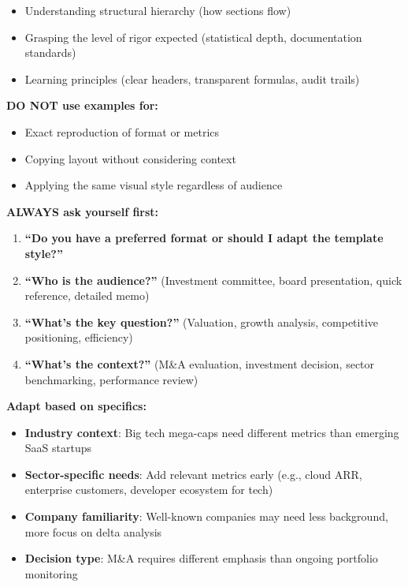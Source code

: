 \documentclass[11pt]{article}
\begin{document}
\begin{itemize}[leftmargin=*,itemsep=2pt,topsep=2pt]
\item {} Understanding structural hierarchy (how sections flow)
\item {} Grasping the level of rigor expected (statistical depth, documentation standards)
\item {} Learning principles (clear headers, transparent formulas, audit trails)
\end{itemize}

\textbf{DO NOT use examples for:}

\begin{itemize}[leftmargin=*,itemsep=2pt,topsep=2pt]
\item {} Exact reproduction of format or metrics
\item {} Copying layout without considering context
\item {} Applying the same visual style regardless of audience
\end{itemize}

\textbf{ALWAYS ask yourself first:}

\begin{enumerate}[leftmargin=*,itemsep=2pt,topsep=2pt]
\item {} \textbf{``Do you have a preferred format or should I adapt the template style?''}
\item {} \textbf{``Who is the audience?''} (Investment committee, board presentation, quick reference, detailed memo)
\item {} \textbf{``What's the key question?''} (Valuation, growth analysis, competitive positioning, efficiency)
\item {} \textbf{``What's the context?''} (M\&A evaluation, investment decision, sector benchmarking, performance review)
\end{enumerate}

\textbf{Adapt based on specifics:}

\begin{itemize}[leftmargin=*,itemsep=2pt,topsep=2pt]
\item {} \textbf{Industry context}: Big tech mega-caps need different metrics than emerging SaaS startups
\item {} \textbf{Sector-specific needs}: Add relevant metrics early (e.g., cloud ARR, enterprise customers, developer ecosystem for tech)
\item {} \textbf{Company familiarity}: Well-known companies may need less background, more focus on delta analysis
\item {} \textbf{Decision type}: M\&A requires different emphasis than ongoing portfolio monitoring
\end{itemize}
\end{document}
